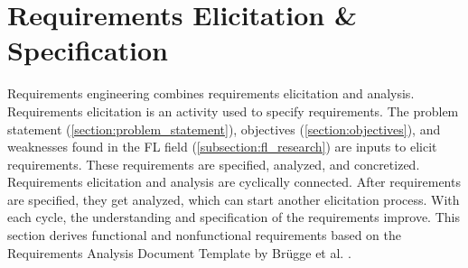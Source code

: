 \section{Requirements Elicitation \& Specification}
Requirements engineering combines requirements elicitation and analysis.
Requirements elicitation is an activity used to specify requirements.
The problem statement (\ref{section:problem_statement}), objectives (\ref{section:objectives}), and weaknesses found in the FL field (\ref{subsection:fl_research}) are inputs to elicit requirements.
These requirements are specified, analyzed, and concretized. 
Requirements elicitation and analysis are cyclically connected.
After requirements are specified, they get analyzed, which can start another elicitation process.
With each cycle, the understanding and specification of the requirements improve.
This section derives functional and nonfunctional requirements based on the Requirements Analysis Document Template by Brügge et al. \cite{book:bruegge}.



